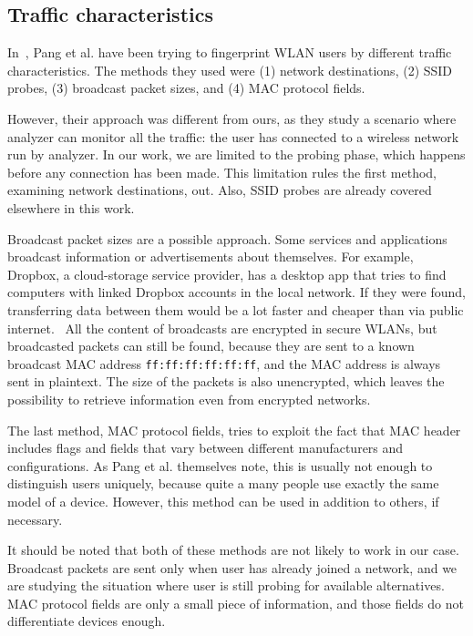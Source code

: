 \documentclass[12pt,a4paper,oneside,pdftex]{report}
\begin{document}
\subsection{Traffic characteristics}

In~\cite{pang2007802}, Pang et al. have been trying to fingerprint WLAN users by different traffic characteristics. The methods they used were (1) network destinations, (2) SSID probes, (3) broadcast packet sizes, and (4) MAC protocol fields. 

However, their approach was different from ours, as they study a scenario where analyzer can monitor all the traffic: the user has connected to a wireless network run by analyzer. In our work, we are limited to the probing phase, which happens before any connection has been made. This limitation rules the first method, examining network destinations, out. Also, SSID probes are already covered elsewhere in this work.

Broadcast packet sizes are a possible approach. Some services and applications broadcast information or advertisements about themselves. For example, Dropbox, a cloud-storage service provider, has a desktop app that tries to find computers with linked Dropbox accounts in the local network. If they were found, transferring data between them would be a lot faster and cheaper than via public internet.~\cite{dropboxlan} All the content of broadcasts are encrypted in secure WLANs, but broadcasted packets can still be found, because they are sent to a known broadcast MAC address \texttt{ff:ff:ff:ff:ff:ff}, and the MAC address is always sent in plaintext. The size of the packets is also unencrypted, which leaves the possibility to retrieve information even from encrypted networks.

The last method, MAC protocol fields, tries to exploit the fact that MAC header includes flags and fields that vary between different manufacturers and configurations. As Pang et al. themselves note, this is usually not enough to distinguish users uniquely, because quite a many people use exactly the same model of a device. However, this method can be used in addition to others, if necessary.

It should be noted that both of these methods are not likely to work in our case. Broadcast packets are sent only when user has already joined a network, and we are studying the situation where user is still probing for available alternatives. MAC protocol fields are only a small piece of information, and those fields do not differentiate devices enough.
\end{document}
